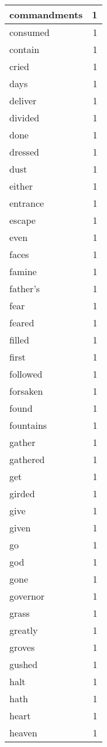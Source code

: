 \begin{center}
\begin{longtable}{l|r}
commandments & 1 \\ \hline
consumed & 1 \\ \hline
contain & 1 \\ \hline
cried & 1 \\ \hline
days & 1 \\ \hline
deliver & 1 \\ \hline
divided & 1 \\ \hline
done & 1 \\ \hline
dressed & 1 \\ \hline
dust & 1 \\ \hline
either & 1 \\ \hline
entrance & 1 \\ \hline
escape & 1 \\ \hline
even & 1 \\ \hline
faces & 1 \\ \hline
famine & 1 \\ \hline
father's & 1 \\ \hline
fear & 1 \\ \hline
feared & 1 \\ \hline
filled & 1 \\ \hline
first & 1 \\ \hline
followed & 1 \\ \hline
forsaken & 1 \\ \hline
found & 1 \\ \hline
fountains & 1 \\ \hline
gather & 1 \\ \hline
gathered & 1 \\ \hline
get & 1 \\ \hline
girded & 1 \\ \hline
give & 1 \\ \hline
given & 1 \\ \hline
go & 1 \\ \hline
god & 1 \\ \hline
gone & 1 \\ \hline
governor & 1 \\ \hline
grass & 1 \\ \hline
greatly & 1 \\ \hline
groves & 1 \\ \hline
gushed & 1 \\ \hline
halt & 1 \\ \hline
hath & 1 \\ \hline
heart & 1 \\ \hline
heaven & 1 \\ \hline

\end{longtable}
\end{center}
